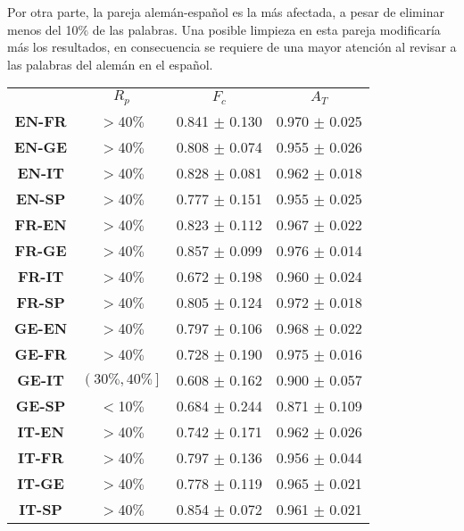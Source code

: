 Por otra parte, la pareja alemán-español es la más afectada, a pesar de eliminar menos del 10$\%$ de las palabras. Una posible limpieza en esta pareja modificaría más los resultados, en consecuencia se requiere de una mayor atención al revisar a las palabras del alemán en el español. 

\begin{table}[t]
	\centering
	\begin{tabular}{cccc}
	          & \textbf{$R_{p}$} & \textbf{$F_{c}$} & \textbf{$A_{T}$} \\[2pt]
		\textbf{EN-FR} & $>$40$\%$  & 0.841 $\pm$ 0.130 &  0.970 $\pm$ 0.025 \\
		\textbf{EN-GE} & $>$40$\%$  & 0.808 $\pm$ 0.074 &  0.955 $\pm$ 0.026 \\
		\textbf{EN-IT} & $>$40$\%$  & 0.828 $\pm$ 0.081 &  0.962 $\pm$ 0.018 \\ 
		\textbf{EN-SP} & $>$40$\%$  & 0.777 $\pm$ 0.151 &  0.955 $\pm$ 0.025 \\[5pt]
		
		\textbf{FR-EN} & $>$40$\%$  & 0.823 $\pm$ 0.112 &  0.967 $\pm$ 0.022 \\
		\rowcolor{bueno}\textbf{FR-GE} & $>$40$\%$  & 0.857 $\pm$ 0.099 &  0.976 $\pm$ 0.014 \\
		\textbf{FR-IT} & $>$40$\%$  & 0.672 $\pm$ 0.198 &  0.960 $\pm$ 0.024 \\ 
		\textbf{FR-SP} & $>$40$\%$  & 0.805 $\pm$ 0.124 &  0.972 $\pm$ 0.018 \\[5pt]
		
		\textbf{GE-EN} & $>$40$\%$  & 0.797 $\pm$ 0.106 &  0.968 $\pm$ 0.022 \\
		\textbf{GE-FR} & $>$40$\%$  & 0.728 $\pm$ 0.190 &  0.975 $\pm$ 0.016 \\
		\textbf{GE-IT} & $\left( 30\%, 40\% \right]$  & 0.608 $\pm$ 0.162 &  0.900 $\pm$ 0.057 \\
		\rowcolor{malo}\textbf{GE-SP} & $<$10$\%$  & 0.684 $\pm$ 0.244 &  0.871 $\pm$ 0.109 \\
		[5pt]
		
		\textbf{IT-EN} & $>$40$\%$  & 0.742 $\pm$ 0.171 &  0.962 $\pm$ 0.026 \\
		\textbf{IT-FR} & $>$40$\%$  & 0.797 $\pm$ 0.136 &  0.956 $\pm$ 0.044 \\
		\textbf{IT-GE} & $>$40$\%$  & 0.778 $\pm$ 0.119 &  0.965 $\pm$ 0.021 \\
		\textbf{IT-SP} & $>$40$\%$  & 0.854 $\pm$ 0.072 &  0.961 $\pm$ 0.021 \\[5pt]
		

\end{tabular}
\end{table}

